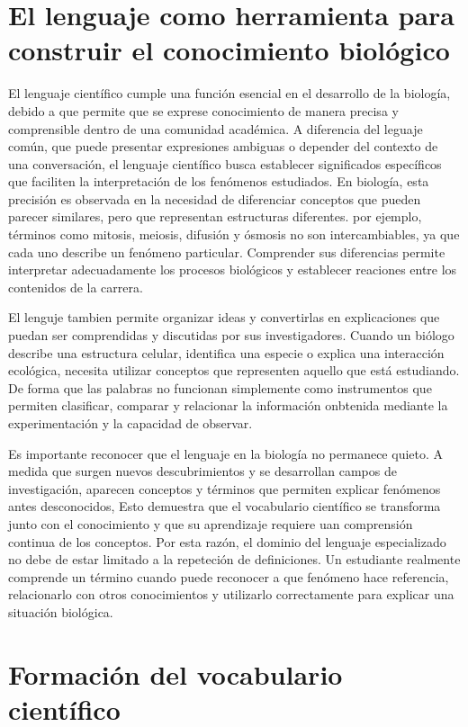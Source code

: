 \documentclass[12pt]{article}
\begin{document}
\section{El lenguaje como herramienta para construir el conocimiento biológico}

El lenguaje científico cumple una función esencial en el desarrollo de la biología, debido a que permite que se exprese conocimiento de manera precisa y comprensible dentro de una comunidad académica. A diferencia del leguaje común, que puede presentar expresiones ambiguas o depender del contexto de una conversación, el lenguaje científico busca establecer significados específicos que faciliten la interpretación de los fenómenos estudiados. En biología, esta precisión  es observada en la necesidad de diferenciar conceptos que pueden parecer similares, pero que representan estructuras diferentes. por ejemplo, términos como mitosis, meiosis, difusión y ósmosis no son intercambiables, ya que cada uno describe un fenómeno particular. Comprender sus diferencias permite interpretar adecuadamente los procesos biológicos y establecer reaciones entre los contenidos de la carrera.

El lenguje tambien permite organizar ideas y convertirlas en explicaciones que puedan ser comprendidas y discutidas por sus investigadores. Cuando un biólogo describe una estructura celular, identifica una especie o explica una interacción ecológica, necesita utilizar conceptos que representen aquello que está estudiando. De forma que las palabras no funcionan simplemente como instrumentos que permiten clasificar, comparar y relacionar la información onbtenida mediante la experimentación y la capacidad de observar.

Es importante reconocer que el lenguaje en la biología no permanece quieto. A medida que surgen nuevos descubrimientos y se desarrollan campos de investigación, aparecen conceptos y términos que permiten explicar fenómenos antes desconocidos, Esto demuestra que el vocabulario científico se transforma junto con el conocimiento y que su aprendizaje requiere uan comprensión continua de los conceptos. Por esta razón, el dominio del lenguaje especializado no debe de estar limitado a la repeteción de definiciones. Un estudiante realmente comprende un término cuando  puede reconocer a que fenómeno hace referencia, relacionarlo con otros conocimientos y utilizarlo correctamente para explicar una situación biológica.

\section{Formación del vocabulario científico}
\end{document}
